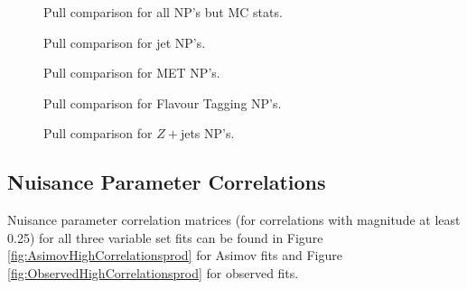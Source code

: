 \begin{figure}
  \caption{Pull comparison for all NP's but MC stats.}
  \label{fig:PullComparisons-allExceptGammas}
\end{figure}

\begin{figure}
  \caption{Pull comparison for jet NP's.}
  \label{fig:PullComparisons-Jet}
\end{figure}

\begin{figure}
  \caption{Pull comparison for MET NP's.}
  \label{fig:PullComparisons-MET}
\end{figure}

\begin{figure}
  \caption{Pull comparison for Flavour Tagging NP's.}
  \label{fig:PullComparisons-BTag}
\end{figure}

\begin{figure}
  \caption{Pull comparison for $Z+$jets NP's.}
  \label{fig:PullComparisons-Zjets}
\end{figure}

\clearpage
\subsection{Nuisance Parameter Correlations}
Nuisance parameter correlation matrices (for correlations with magnitude at least 0.25) for all three variable set fits can be found in Figure \ref{fig:AsimovHighCorrelationsprod} for Asimov fits and Figure \ref{fig:ObservedHighCorrelationsprod} for observed fits.

